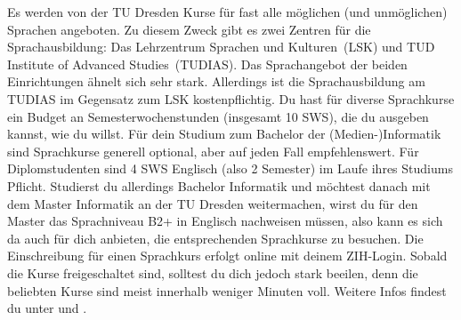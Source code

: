 Es werden von der TU Dresden Kurse für fast alle möglichen (und unmöglichen) Sprachen angeboten.
Zu diesem Zweck gibt es zwei Zentren für die Sprachausbildung: Das \glqq Lehrzentrum Sprachen und Kulturen\grqq\ (LSK) und \glqq TUD Institute of Advanced Studies\grqq\ (TUDIAS).
Das Sprachangebot der beiden Einrichtungen ähnelt sich sehr stark. Allerdings ist die Sprachausbildung am TUDIAS im Gegensatz zum LSK kostenpflichtig.
Du hast für diverse Sprachkurse ein Budget an Semesterwochenstunden (insgesamt 10 SWS), die du ausgeben kannst, wie du willst.
Für dein Studium zum Bachelor der (Medien-)Informatik sind Sprachkurse generell optional, aber auf jeden Fall empfehlenswert.
Für Diplomstudenten sind 4 SWS Englisch (also 2 Semester) im Laufe ihres Studiums Pflicht.
Studierst du allerdings Bachelor Informatik und möchtest danach mit dem Master Informatik an der TU Dresden weitermachen, wirst du für den Master das Sprachniveau B2+ in Englisch nachweisen müssen, also kann es sich da auch für dich anbieten, die entsprechenden Sprachkurse zu besuchen.
Die Einschreibung für einen Sprachkurs erfolgt online  mit deinem ZIH-Login.
Sobald die Kurse freigeschaltet sind, solltest du dich jedoch stark beeilen, denn die beliebten Kurse sind meist innerhalb weniger Minuten voll.
Weitere Infos findest du unter  und .
